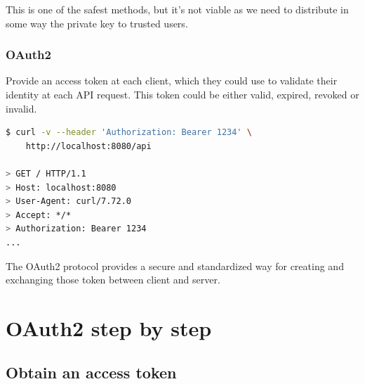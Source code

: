 \documentclass[11pt]{style}
\begin{document}
This is one of the safest methods, but it's not viable as we need to distribute in some way the private key to
trusted users.

\subsubsection{OAuth2}
Provide an access token at each client, which they could use to validate their
identity at each API request.  This token could be either valid, expired,
revoked or invalid.

\begin{lstlisting}[language=bash]
$ curl -v --header 'Authorization: Bearer 1234' \
    http://localhost:8080/api

> GET / HTTP/1.1
> Host: localhost:8080
> User-Agent: curl/7.72.0
> Accept: */*
> Authorization: Bearer 1234
...
\end{lstlisting}

The OAuth2 protocol provides a secure and standardized way for creating and exchanging those token between client and server.


\section{OAuth2 step by step}
\subsection{Obtain an access token}
\end{document}
